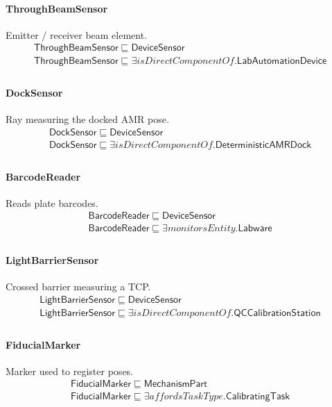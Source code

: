 \documentclass[10pt]{article}
\begin{document}
\paragraph{ThroughBeamSensor} Emitter / receiver beam element.
\[\begin{array}{l}
\mathsf{ThroughBeamSensor} \sqsubseteq  \mathsf{DeviceSensor} \\
\mathsf{ThroughBeamSensor} \sqsubseteq  \exists \mathit{isDirectComponentOf}.\mathsf{LabAutomationDevice} \\
\end{array}\]
\paragraph{DockSensor} Ray measuring the docked AMR pose.
\[\begin{array}{l}
\mathsf{DockSensor} \sqsubseteq  \mathsf{DeviceSensor} \\
\mathsf{DockSensor} \sqsubseteq  \exists \mathit{isDirectComponentOf}.\mathsf{DeterministicAMRDock} \\
\end{array}\]
\paragraph{BarcodeReader} Reads plate barcodes.
\[\begin{array}{l}
\mathsf{BarcodeReader} \sqsubseteq  \mathsf{DeviceSensor} \\
\mathsf{BarcodeReader} \sqsubseteq  \exists \mathit{monitorsEntity}.\mathsf{Labware} \\
\end{array}\]
\paragraph{LightBarrierSensor} Crossed barrier measuring a TCP.
\[\begin{array}{l}
\mathsf{LightBarrierSensor} \sqsubseteq  \mathsf{DeviceSensor} \\
\mathsf{LightBarrierSensor} \sqsubseteq  \exists \mathit{isDirectComponentOf}.\mathsf{QCCalibrationStation} \\
\end{array}\]
\paragraph{FiducialMarker} Marker used to register poses.
\[\begin{array}{l}
\mathsf{FiducialMarker} \sqsubseteq  \mathsf{MechanismPart} \\
\mathsf{FiducialMarker} \sqsubseteq  \exists \mathit{affordsTaskType}.\mathsf{CalibratingTask} \\
\end{array}\]
\end{document}
